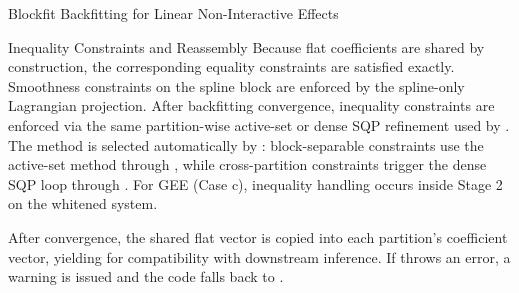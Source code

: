\begin{Section}{Blockfit Backfitting for Linear Non-Interactive Effects}
%
\begin{SubSection}{Inequality Constraints and Reassembly}
Because flat coefficients are shared by construction, the corresponding
equality constraints are satisfied exactly. Smoothness constraints on the
spline block are enforced by the spline-only Lagrangian projection.
After backfitting convergence, inequality constraints are enforced via
the same partition-wise active-set or dense SQP refinement used by
. The method is selected automatically by
: block-separable constraints use the
active-set method through , while
cross-partition constraints trigger the dense SQP loop through
. For GEE (Case c), inequality handling
occurs inside Stage 2 on the whitened system.

After convergence, the shared flat vector  is copied
into each partition's coefficient vector, yielding
 for compatibility with downstream inference.
If  throws an error, a warning is issued
and the code falls back to .
\end{SubSection}

\end{Section}
%
